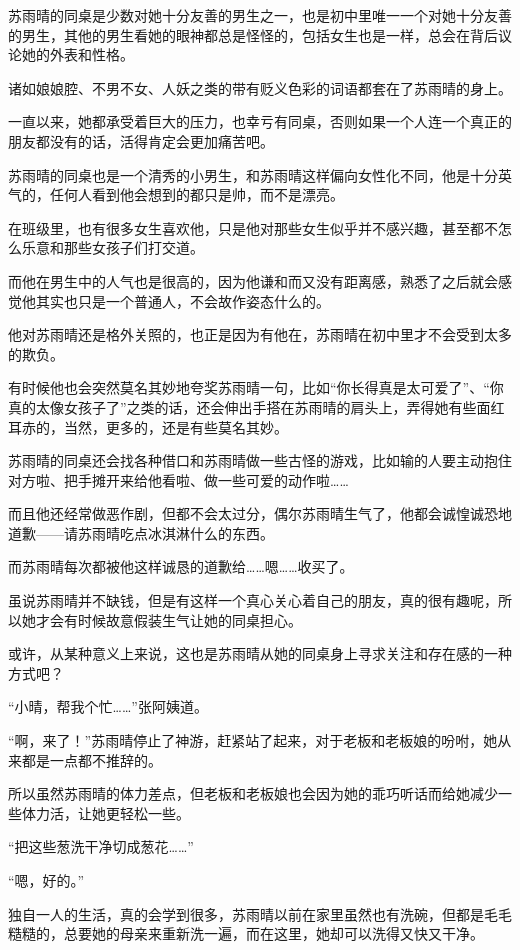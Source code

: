 苏雨晴的同桌是少数对她十分友善的男生之一，也是初中里唯一一个对她十分友善的男生，其他的男生看她的眼神都总是怪怪的，包括女生也是一样，总会在背后议论她的外表和性格。

诸如娘娘腔、不男不女、人妖之类的带有贬义色彩的词语都套在了苏雨晴的身上。

一直以来，她都承受着巨大的压力，也幸亏有同桌，否则如果一个人连一个真正的朋友都没有的话，活得肯定会更加痛苦吧。

苏雨晴的同桌也是一个清秀的小男生，和苏雨晴这样偏向女性化不同，他是十分英气的，任何人看到他会想到的都只是帅，而不是漂亮。

在班级里，也有很多女生喜欢他，只是他对那些女生似乎并不感兴趣，甚至都不怎么乐意和那些女孩子们打交道。

而他在男生中的人气也是很高的，因为他谦和而又没有距离感，熟悉了之后就会感觉他其实也只是一个普通人，不会故作姿态什么的。

他对苏雨晴还是格外关照的，也正是因为有他在，苏雨晴在初中里才不会受到太多的欺负。

有时候他也会突然莫名其妙地夸奖苏雨晴一句，比如“你长得真是太可爱了”、“你真的太像女孩子了”之类的话，还会伸出手搭在苏雨晴的肩头上，弄得她有些面红耳赤的，当然，更多的，还是有些莫名其妙。

苏雨晴的同桌还会找各种借口和苏雨晴做一些古怪的游戏，比如输的人要主动抱住对方啦、把手摊开来给他看啦、做一些可爱的动作啦……

而且他还经常做恶作剧，但都不会太过分，偶尔苏雨晴生气了，他都会诚惶诚恐地道歉——请苏雨晴吃点冰淇淋什么的东西。

而苏雨晴每次都被他这样诚恳的道歉给……嗯……收买了。

虽说苏雨晴并不缺钱，但是有这样一个真心关心着自己的朋友，真的很有趣呢，所以她才会有时候故意假装生气让她的同桌担心。

或许，从某种意义上来说，这也是苏雨晴从她的同桌身上寻求关注和存在感的一种方式吧？

“小晴，帮我个忙……”张阿姨道。

“啊，来了！”苏雨晴停止了神游，赶紧站了起来，对于老板和老板娘的吩咐，她从来都是一点都不推辞的。

所以虽然苏雨晴的体力差点，但老板和老板娘也会因为她的乖巧听话而给她减少一些体力活，让她更轻松一些。

“把这些葱洗干净切成葱花……”

“嗯，好的。”

独自一人的生活，真的会学到很多，苏雨晴以前在家里虽然也有洗碗，但都是毛毛糙糙的，总要她的母亲来重新洗一遍，而在这里，她却可以洗得又快又干净。


